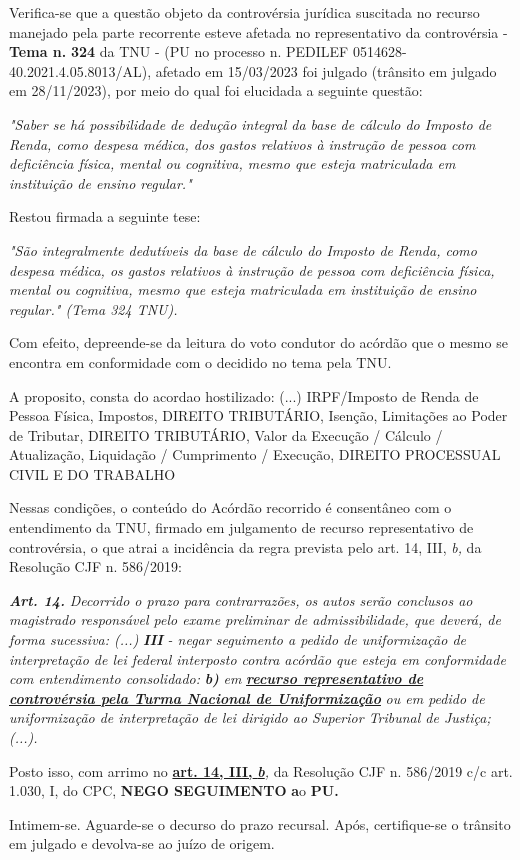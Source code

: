 \documentclass[12pt]{article}
\begin{document}
\justifying
\noindent Verifica-se que a questão objeto da controvérsia jurídica suscitada no recurso manejado pela parte recorrente esteve afetada no representativo da controvérsia - \textbf{Tema n. }\textbf{324} da TNU - (PU no processo n. PEDILEF 0514628-40.2021.4.05.8013/AL),  afetado em 15/03/2023 foi julgado (trânsito em julgado em 28/11/2023), por meio do qual foi elucidada a seguinte questão:

\noindent \textit{"Saber se há possibilidade de dedução integral da base de cálculo do Imposto de Renda, como despesa médica, dos gastos relativos à instrução de pessoa com deficiência física, mental ou cognitiva, mesmo que esteja matriculada em instituição de ensino regular."}

\noindent Restou firmada a seguinte tese:

\noindent \textit{"São integralmente dedutíveis da base de cálculo do Imposto de Renda, como despesa médica, os gastos relativos à instrução de pessoa com deficiência física, mental ou cognitiva, mesmo que esteja matriculada em instituição de ensino regular." (Tema 324 TNU).}

\noindent Com efeito, depreende-se da leitura do voto condutor do acórdão que o mesmo se encontra em conformidade com o decidido no  tema pela TNU.

\noindent A proposito, consta do acordao hostilizado: (...) IRPF/Imposto de Renda de Pessoa Física, Impostos, DIREITO TRIBUTÁRIO, Isenção, Limitações ao Poder de Tributar, DIREITO TRIBUTÁRIO, Valor da Execução / Cálculo / Atualização, Liquidação / Cumprimento / Execução, DIREITO PROCESSUAL CIVIL E DO TRABALHO

\noindent Nessas condições, o conteúdo do Acórdão recorrido é consentâneo com o entendimento da TNU, firmado em julgamento de recurso representativo de controvérsia, o que atrai a incidência da regra prevista pelo art. 14, III, \textit{b,} da Resolução CJF n. 586/2019:

\noindent \textit{\textbf{Art. 14.}}\textit{ Decorrido o prazo para contrarrazões, os autos serão conclusos ao magistrado responsável pelo exame preliminar de admissibilidade, que deverá, de forma sucessiva: (...) }\textit{\textbf{III }}\textit{- negar seguimento a pedido de uniformização de interpretação de lei federal interposto contra acórdão que esteja em conformidade com entendimento consolidado: }\textit{\textbf{b)}}\textit{ em }\uline{\textit{\textbf{recurso representativo de controvérsia pela Turma Nacional de Uniformização}}}\textit{ ou em pedido de uniformização de interpretação de lei dirigido ao Superior Tribunal de Justiça;(...).}

\noindent Posto isso, com arrimo no \uline{\textbf{art. 14, III, }}\uline{\textit{\textbf{b}}}\textit{,} da Resolução CJF n. 586/2019 c/c art. 1.030, I, do CPC, \textbf{NEGO SEGUIMENTO }\textbf{a}o\textbf{ PU}\textbf{.}

\noindent Intimem-se. Aguarde-se o decurso do prazo recursal. Após, certifique-se o trânsito em julgado e devolva-se ao juízo de origem.
\end{document}
